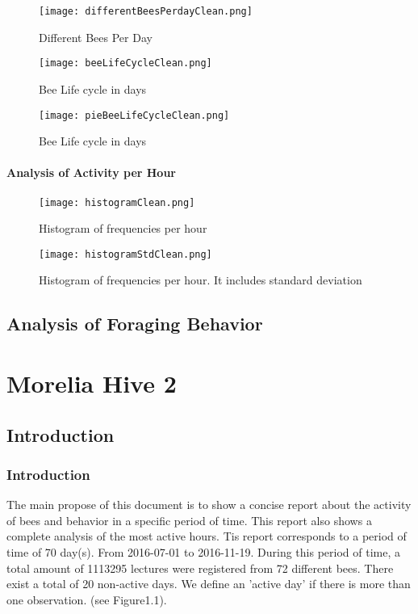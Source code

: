 \documentclass[11pt,fleqn]{book} %
\begin{document}
\begin{figure}[h!]%
\centering%
\texttt{[image: differentBeesPerdayClean.png]}%
\caption{Different Bees Per Day}%
\end{figure}

%


\begin{figure}[h!]%
\centering%
\texttt{[image: beeLifeCycleClean.png]}%
\caption{Bee Life cycle in days}%
\end{figure}

%


\begin{figure}[h!]%
\centering%
\texttt{[image: pieBeeLifeCycleClean.png]}%
\caption{Bee Life cycle in days}%
\end{figure}

%
\subsection*{Analysis of Activity per Hour}%


\begin{figure}[h!]%
\centering%
\texttt{[image: histogramClean.png]}%
\caption{Histogram of frequencies per hour}%
\end{figure}

%


\begin{figure}[h!]%
\centering%
\texttt{[image: histogramStdClean.png]}%
\caption{Histogram of frequencies per hour. It includes standard deviation}%
\end{figure}

\chapter{Analysis of Foraging Behavior}
\part{Morelia Hive 2}
\chapter{Introduction} 
\normalsize%
\section*{Introduction}%
The main propose of this document  is to show a concise report about the activity of bees and behavior in a specific period of time. This report also shows a complete analysis of the most active hours.\newline%
\newline%
Tis report corresponds to a period of time of 70 day(s). From 2016{-}07{-}01 to 2016{-}11{-}19. During this period of time, a total amount of 1113295 lectures were registered from 72 different bees. There exist a total of 20 non{-}active days. We define an 'active day' if there is more than one observation. (see Figure1.1).\newline%
\newline%
%
\end{document}
